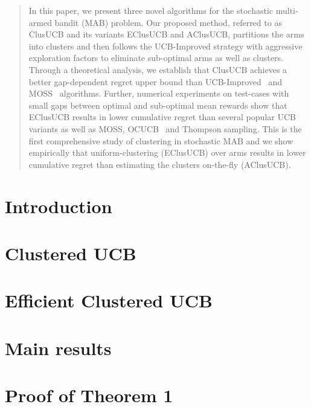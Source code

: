 \documentclass{article}
\begin{document}

\begin{abstract}
In this paper, we present three novel algorithms for the stochastic multi-armed bandit (MAB) problem. Our proposed method, referred to as ClusUCB and its variants EClusUCB and AClusUCB, partitions the arms into clusters and then follows the UCB-Improved strategy with aggressive exploration factors to eliminate sub-optimal arms as well as clusters. Through a theoretical analysis, we establish that ClusUCB achieves a better gap-dependent regret upper bound than UCB-Improved~\cite{auer2010ucb} and MOSS~\cite{audibert2009minimax} algorithms. Further, numerical experiments on test-cases with small gaps between optimal and sub-optimal mean rewards show that EClusUCB results in lower cumulative regret than several popular UCB variants as well as MOSS, OCUCB~\cite{lattimore2015optimally} and Thompson sampling. This is the first comprehensive study of clustering in stochastic MAB and we show empirically  that uniform-clustering (EClusUCB) over arms results in lower cumulative regret than estimating the clusters on-the-fly (AClusUCB).  
\end{abstract}
\vspace*{-2em}
\section{Introduction}
\label{sec:intro}

%
\vspace*{-1.6em}
\section{Clustered UCB}
\label{sec:clusucb}
\vspace*{-0.7em}

%
\vspace*{-1.6em}
\section{Efficient Clustered UCB}
\label{sec:eclusucb}
\vspace*{-0.7em}

%
\section{Main results}
\label{sec:results}

%
\section{Proof of Theorem 1}
\label{sec:proofTheorem}

%
\vspace*{-1.6em}
\end{document}
